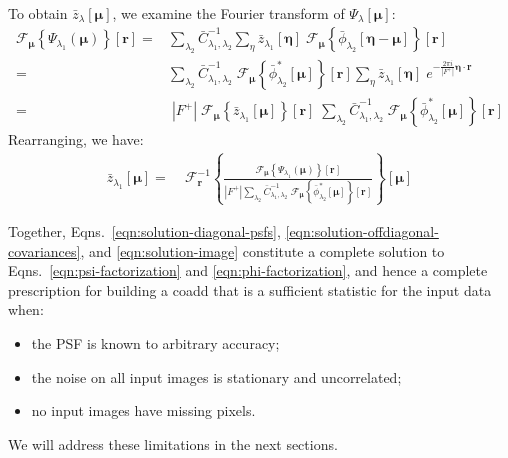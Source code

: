 \documentclass[DM,authoryear,toc]{lsstdoc}
\begin{document}
To obtain $\bar{z}_{\lambda}[\bm{\mu}]$, we examine the Fourier transform of $\Psi_{\lambda}[\bm{\mu}]$:
\begin{align}
    \mathcal{F}_{\bm{\mu}}\!\left\{
        \Psi_{\lambda_1}(\bm{\mu})
    \right\}\!\left[
        \bm{r}
    \right]
    = &
        \sum_{\lambda_2}
        \bar{C}_{\lambda_1,\lambda_2}^{-1}
        \sum_{\eta}
        \bar{z}_{\lambda_1}[\bm{\eta}]
        \;
        \mathcal{F}_{\bm{\mu}}\!\left\{
            \bar{\phi}_{\lambda_2}[\bm{\eta}-\bm{\mu}]
        \right\}\!\left[
            \bm{r}
        \right]
    \\
    = &
        \sum_{\lambda_2}
        \bar{C}_{\lambda_1,\lambda_2}^{-1}
        \;
        \mathcal{F}_{\bm{\mu}}\!\left\{
            \bar{\phi}^*_{\lambda_2}[\bm{\mu}]
        \right\}\!\left[
            \bm{r}
        \right]
        \sum_{\eta}
        \bar{z}_{\lambda_1}[\bm{\eta}]
        \;
        e^{-\frac{2\pi i}{|F^+|} \bm{\eta}\cdot\bm{r}}
    \\
    = & \;
        |F^+|
        \;
        \mathcal{F}_{\bm{\mu}}\!\left\{
            \bar{z}_{\lambda_1}[\bm{\mu}]
        \right\}\!\left[
            \bm{r}
        \right]
        \;
        \sum_{\lambda_2}
        \bar{C}_{\lambda_1,\lambda_2}^{-1}
        \;
        \mathcal{F}_{\bm{\mu}}\!\left\{
            \bar{\phi}^*_{\lambda_2}[\bm{\mu}]
        \right\}\!\left[
            \bm{r}
        \right]
\end{align}
Rearranging, we have:
\begin{align}
    \bar{z}_{\lambda_1}[\bm{\mu}]
    =&\;
    \mathcal{F}^{-1}_{\bm{r}}\!\left\{
        \frac{
            \mathcal{F}_{\bm{\mu}}\!\left\{
                \Psi_{\lambda_1}(\bm{\mu})
            \right\}\!\left[
                \bm{r}
            \right]
        }{
            |F^+|
            \sum\limits_{\lambda_2}
            \bar{C}_{\lambda_1,\lambda_2}^{-1}
            \;
            \mathcal{F}_{\bm{\mu}}\!\left\{
                \bar{\phi}^*_{\lambda_2}[\bm{\mu}]
            \right\}\!\left[
                \bm{r}
            \right]
        }
        \right\}\!\left[
        \bm{\mu}
    \right]
    \label{eqn:solution-image}
\end{align}

Together, Eqns.~\ref{eqn:solution-diagonal-psfs}, \ref{eqn:solution-offdiagonal-covariances}, and \ref{eqn:solution-image} constitute a complete solution to Eqns.~\ref{eqn:psi-factorization} and \ref{eqn:phi-factorization}, and hence a complete prescription for building a coadd that is a sufficient statistic for the input data when:
\begin{itemize}
    \item the PSF is known to arbitrary accuracy;
    \item the noise on all input images is stationary and uncorrelated;
    \item no input images have missing pixels.
\end{itemize}
We will address these limitations in the next sections.
\end{document}
